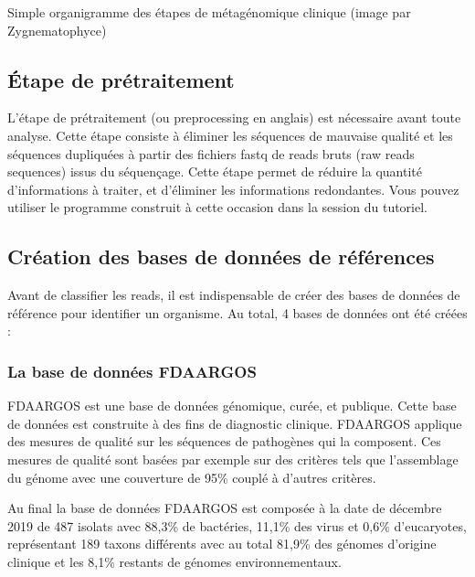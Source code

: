 \documentclass[letterpaper,10pt,french]{sphinxmanual}
\begin{document}
Simple organigramme des étapes de métagénomique clinique (image par Zygnematophyce)


\subsection{Étape de prétraitement}
\label{\detokenize{overview:etape-de-pretraitement}}
L’étape de prétraitement (ou pre\sphinxhyphen{}processing en anglais) est nécessaire avant toute analyse. Cette étape consiste à éliminer les séquences de mauvaise qualité et les séquences dupliquées à partir des fichiers fastq de reads bruts (raw reads sequences) issus du séquençage. Cette étape permet de réduire la quantité d’informations à traiter, et d’éliminer les informations redondantes. Vous pouvez utiliser le programme construit à cette occasion dans la session {\hyperref[\detokenize{tutorial:pre-processing}]{}} du tutoriel.


\subsection{Création des bases de données de références}
\label{\detokenize{overview:creation-des-bases-de-donnees-de-references}}
Avant de classifier les reads, il est indispensable de créer des bases de données de référence pour identifier un organisme. Au total, 4 bases de données ont été créées :


\subsubsection{La base de données FDA\sphinxhyphen{}ARGOS}
\label{\detokenize{overview:la-base-de-donnees-fda-argos}}
FDA\sphinxhyphen{}ARGOS est une base de données génomique, curée, et publique. Cette base de
données est construite à des fins de diagnostic clinique. FDA\sphinxhyphen{}ARGOS applique des mesures de qualité sur les séquences de pathogènes qui la composent. Ces mesures de qualité sont basées par exemple sur des critères tels que l’assemblage du génome avec une couverture de 95\% couplé à d’autres critères.

Au final la base de données FDA\sphinxhyphen{}ARGOS est composée à la date de décembre 2019 de 487 isolats avec 88,3\% de bactéries, 11,1\% des virus et 0,6\% d’eucaryotes, représentant 189 taxons différents avec au total 81,9\% des génomes d’origine clinique et les 8,1\% restants de génomes environnementaux.
\end{document}
